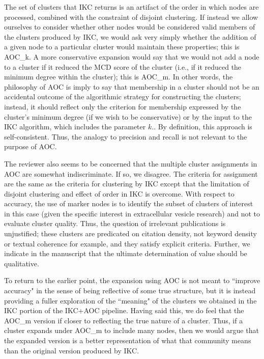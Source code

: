 \documentclass[11pt, oneside]{article}   	%
\begin{document}
{The set of clusters that IKC returns is an artifact of the order in which nodes are processed, combined with the constraint of disjoint clustering. If instead we allow ourselves to consider whether other nodes would be considered valid members of the clusters produced by IKC, we would ask very simply whether the addition of a given node to a particular cluster would maintain these properties; this is AOC\_k.  A more conservative expansion would say that we would not add a node to a cluster if it reduced the MCD score of the cluster (i.e., if it reduced the minimum degree within the cluster); this is AOC\_{m}.  In other words, the philosophy of AOC is imply to say that membership in a cluster should not be an accidental outcome of the algorithmic strategy for constructing the clusters; instead, it should reflect only the criterion for membership expressed by the cluster's minimum degree (if we wish to be conservative) or by the input to the IKC algorithm, which includes the parameter $k$.}.  By definition, this approach is self-consistent. Thus, the analogy to precision and recall is not relevant to the purpose of AOC. 

The reviewer also seems to be concerned that the multiple cluster assignments in AOC are somewhat indiscriminate. If so, we disagree. The criteria for assignment are the same as the criteria for clustering by IKC except that the limitation of disjoint clustering and effect of order in IKC is overcome. With respect to accuracy, the  use of marker nodes is to identify the subset of clusters of interest in this case (given the specific interest in extracellular vesicle research) and not to evaluate cluster quality. Thus, the  question of irrelevant publications is  unjustified; these clusters are predicated on citation density, not keyword density or textual coherence for example, and they satisfy explicit criteria. Further, we indicate in the manuscript that the ultimate determination of value should be qualitative.

To return to the earlier point, the expansion using AOC is not meant to ``improve accuracy" in the sense of being reflective of some true structure, but it is instead providing a fuller exploration of the ``meaning" of the clusters we obtained in the IKC portion of the IKC+AOC pipeline.  Having said this, we do feel that the AOC\_{m} version if closer to reflecting the true nature of a cluster. Thus, if a cluster expands under AOC\_{m}  to include many nodes, then we would argue that the expanded version  is a better representation of what that community means than the original version produced by IKC. 
\end{document}
